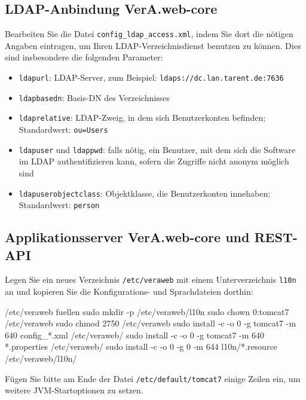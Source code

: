 \subsection{LDAP-Anbindung VerA.web-core}\label{subsec:setup-core-ldap}

Bearbeiten Sie die Datei \texttt{config\_ldap\_access.xml}, indem Sie
dort die nötigen Angaben eintragen, um Ihren LDAP-Verzeichnisdienst
benutzen zu können. Dies sind insbesondere die folgenden Parameter:\keinumbruch

\begin{itemize}
 \item{\texttt{ldapurl}: LDAP-Server, zum Beispiel:
  \texttt{ldaps://dc.lan.tarent.de:7636}}
 \item{\texttt{ldapbasedn}: Basis-DN des Verzeichnisses}
 \item{\texttt{ldaprelative}: LDAP-Zweig, in dem sich Benutzerkonten
  befinden; Standardwert: \texttt{ou=Users}}
 \item{\texttt{ldapuser} und \texttt{ldappwd}: falls nötig, ein
  Benutzer, mit dem sich die Software im LDAP authentifizieren kann,
  sofern die Zugriffe nicht anonym möglich sind}
 \item{\texttt{ldapuserobjectclass}: Objektklasse, die Benutzerkonten
  innehaben; Standardwert: \texttt{person}}
\end{itemize}

\subsection{Applikationsserver VerA.web-core und REST-API}\label{subsec:setup-core-tomcat}

\begin{minipage}{\textwidth}
Legen Sie ein neues Verzeichnis \texttt{/etc/veraweb} mit einem
Unterverzeichnis \texttt{l10n} an und kopieren Sie die Konfigurations-
und Sprachdateien dorthin:

\begin{lstdump}{/etc/veraweb fuellen}
sudo mkdir -p /etc/veraweb/l10n
sudo chown 0:tomcat7 /etc/veraweb
sudo chmod 2750 /etc/veraweb
sudo install -c -o 0 -g tomcat7 -m 640 config_*.xml /etc/veraweb/
sudo install -c -o 0 -g tomcat7 -m 640 *.properties /etc/veraweb/
sudo install -c -o 0 -g 0 -m 644 l10n/*.resource /etc/veraweb/l10n/
\end{lstdump}
\end{minipage}

Fügen Sie bitte am Ende der Datei \texttt{/etc/default/tomcat7}
einige Zeilen ein, um weitere JVM-Startoptionen zu setzen.


